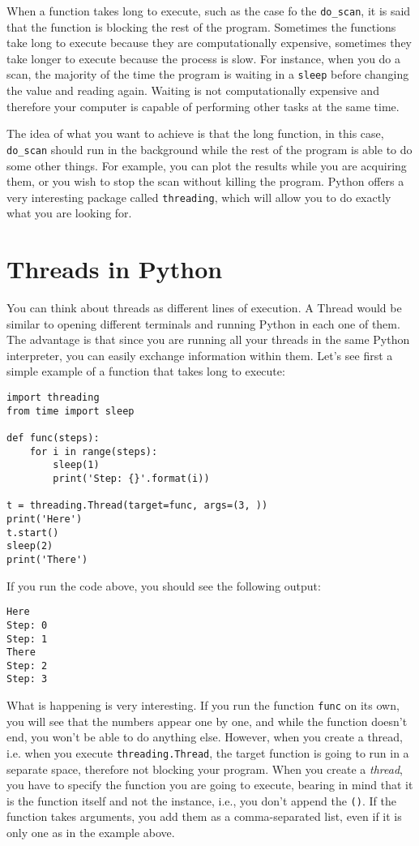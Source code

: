When a function takes long to execute, such as the case fo the
\texttt{do_scan}, it is said that the function is blocking the rest of
the program. Sometimes the functions take long to execute because they
are computationally expensive, sometimes they take longer to execute
because the process is slow. For instance, when you do a scan, the
majority of the time the program is waiting in a \texttt{sleep} before
changing the value and reading again. Waiting is not computationally
expensive and therefore your computer is capable of performing other
tasks at the same time.

The idea of what you want to achieve is that the long function, in this
case, \texttt{do_scan} should run in the background while the rest of
the program is able to do some other things. For example, you can plot
the results while you are acquiring them, or you wish to stop the scan
without killing the program. Python offers a very interesting package
called \texttt{threading}, which will allow you to do exactly what you
are looking for.

\section{Threads in Python}\label{threads-inpython}
You can think about threads as different lines of execution. A Thread
would be similar to opening different terminals and running Python in
each one of them. The advantage is that since you are running all your
threads in the same Python interpreter, you can easily exchange
information within them. Let's see first a simple example of a function that takes long to execute:

\begin{verbatim}
import threading
from time import sleep

def func(steps):
    for i in range(steps):
        sleep(1)
        print('Step: {}'.format(i))

t = threading.Thread(target=func, args=(3, ))
print('Here')
t.start()
sleep(2)
print('There')
\end{verbatim}

If you run the code above, you should see the following output:

\begin{verbatim}
Here
Step: 0
Step: 1
There
Step: 2
Step: 3
\end{verbatim}

What is happening is very interesting. If you run the function
\texttt{func} on its own, you will see that the numbers appear one by
one, and while the function doesn't end, you won't be able to do
anything else. However, when you create a thread, i.e. when you execute
\texttt{threading.Thread}, the target function is going to run in a
separate space, therefore not blocking your program. When you create a
\emph{thread}, you have to specify the function you are going to
execute, bearing in mind that it is the function itself and not the
instance, i.e., you don't append the \texttt{()}. If the function takes
arguments, you add them as a comma-separated list, even if it is only
one as in the example above.

